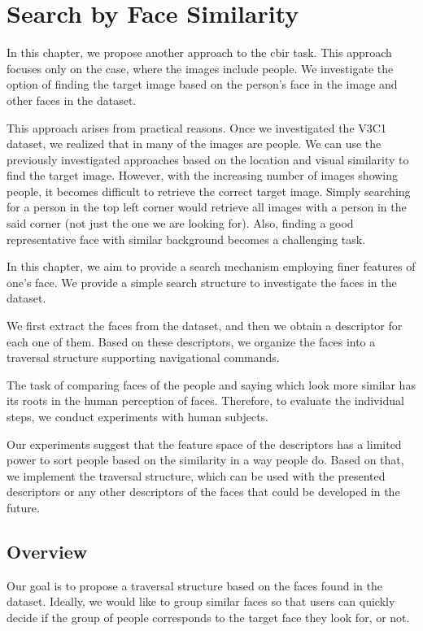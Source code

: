 \chapter{Search by Face Similarity}
\label{ch:face_search}

In this chapter, we propose another approach to the \acrshort{cbir} task. This approach focuses only on the case, where the images include people.
We investigate the option of finding the target image based on the person's face in the image and other faces in the dataset.

This approach arises from practical reasons. Once we investigated the V3C1 dataset, we realized that in many of the images are people. We can use the previously investigated approaches based on the location and visual similarity to find the target image. However, with the increasing number of images showing people, it becomes difficult to retrieve the correct target image. Simply searching for a person in the top left corner would retrieve all images with a person in the said corner (not just the one we are looking for). Also, finding a good representative face with similar background becomes a challenging task.

In this chapter, we aim to provide a search mechanism employing finer features of one's face. We provide a simple search structure to investigate the faces in the dataset.

We first extract the faces from the dataset, and then we obtain a descriptor for each one of them. Based on these descriptors, we organize the faces into a traversal structure supporting navigational commands.

The task of comparing faces of the people and saying which look more similar has its roots in the human perception of faces. Therefore, to evaluate the individual steps, we conduct experiments with human subjects.

Our experiments suggest that the feature space of the descriptors has a limited power to sort people based on the similarity in a way people do. Based on that, we implement the traversal structure, which can be used with the presented descriptors or any other descriptors of the faces that could be developed in the future.


\section{Overview}

Our goal is to propose a traversal structure based on the faces found in the dataset. Ideally, we would like to group similar faces so that users can quickly decide if the group of people corresponds to the target face they look for, or not.

